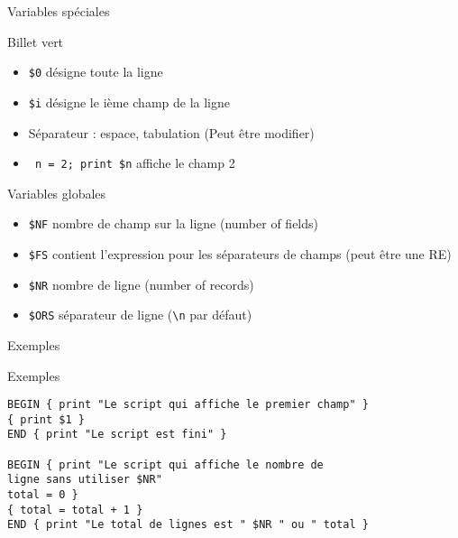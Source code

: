 \def\ftitle{Variables spéciales}
\begin{frame}[containsverbatim]{\ftitle}
\def\blocktitle{Billet vert}
\begin{block}{\blocktitle}
\begin{itemize}
\item \verb!$0! désigne toute la ligne
\item \verb!$i! désigne le ième champ de la ligne
\item Séparateur : espace, tabulation (Peut être modifier)
\item \verb! n = 2; print $n! affiche le champ 2%
\end{itemize}
\end{block}
\def\blocktitle{Variables globales}
\begin{block}{\blocktitle}
\begin{itemize}
\item \verb!$NF! nombre de champ sur la ligne (number of fields)%
\item \verb!$FS! contient l'expression pour les séparateurs de champs (peut être une RE)%
\item \verb!$NR! nombre de ligne (number of records)%
\item \verb!$ORS! séparateur de ligne (\verb!\n! par défaut)%
\end{itemize}
\end{block}
\end{frame}


\def\ftitle{Exemples}
\begin{frame}[containsverbatim]{\ftitle}
\def\blocktitle{Exemples}
\begin{block}{\blocktitle}
\begin{verbatim}
BEGIN { print "Le script qui affiche le premier champ" }
{ print $1 }
END { print "Le script est fini" }

BEGIN { print "Le script qui affiche le nombre de 
ligne sans utiliser $NR"
total = 0 }
{ total = total + 1 }
END { print "Le total de lignes est " $NR " ou " total }
\end{verbatim}%
\end{block}
\end{frame}

